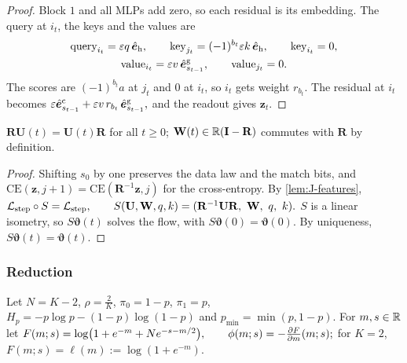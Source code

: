 \begin{proof}
Block $1$ and all MLPs add zero, so each residual is its embedding. The query at $i_t$, the keys and the values are
\begin{gather*}
 \text{query}_{i_t}=\varepsilon q\,\hat{\bm e}_{\mathrm h},\qquad \text{key}_{j_t}=(-1)^{b_t}\varepsilon k\,\hat{\bm e}_{\mathrm h},\qquad \text{key}_{i_t}=0,\\
 \text{value}_{i_t}=\varepsilon v\,\hat{\bm e}^{\mathrm g}_{s_{t-1}},\qquad \text{value}_{j_t}=0 .
\end{gather*}
The scores are $(-1)^{b_t}a$ at $j_t$ and $0$ at $i_t$, so $i_t$ gets weight $r_{b_t}$. The residual at $i_t$ becomes
 $\varepsilon\hat{\bm e}^{\mathrm c}_{s_{t-1}}+\varepsilon v\,r_{b_t}\,\hat{\bm e}^{\mathrm g}_{s_{t-1}},$ 
and the readout gives $\bm z_t$.
\end{proof}

\begin{lemma}
\label{lem:J-symmetry}
$\mathbf R\mathbf U(t)=\mathbf U(t)\mathbf R$ for all $t\ge0$; $\mathbf W(t)\in\mathbb R(\mathbf I-\mathbf R)$ commutes with $\mathbf R$ by definition.
\end{lemma}

\begin{proof}
Shifting $s_0$ by one preserves the data law and the match bits, and $\mathrm{CE}(\bm z,j+1)=\mathrm{CE}(\mathbf R^{-1}\bm z,j)$ for the cross-entropy. By \cref{lem:J-features},
 $\mathcal L_{\mathrm{step}}\circ S=\mathcal L_{\mathrm{step}},\qquad S(\mathbf U,\mathbf W,q,k)=(\mathbf R^{-1}\mathbf U\mathbf R,\ \mathbf W,\ q,\ k).$ 
$S$ is a linear isometry, so $S\bm\vartheta(t)$ solves the flow, with $S\bm\vartheta(0)=\bm\vartheta(0)$. By uniqueness, $S\bm\vartheta(t)=\bm\vartheta(t)$.
\end{proof}

\subsubsection{Reduction}

Let $N=K-2$, $\rho=\frac{2}{K}$, $\pi_0=1-p$, $\pi_1=p$, $H_p=-p\log p-(1-p)\log(1-p)$ and $p_{\min}=\min(p,1-p)$. For $m,s\in\mathbb R$ let
 $F(m;s)=\log\bigl(1+e^{-m}+N e^{-s-m/2}\bigr),\qquad \phi(m;s)=-\pd{F}{m}(m;s);$ 
for $K=2$, $F(m;s)=\ell(m):=\log(1+e^{-m})$.

